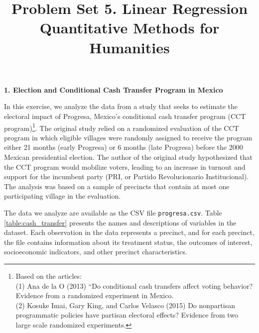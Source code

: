 \documentclass[12pt]{article}
\author{\empty}
\title{Problem Set 5. Linear Regression \\ Quantitative Methods for Humanities}
\date{\empty}
\begin{document}
\maketitle

\begin{center}
    \textbf{\large 1. Election and Conditional Cash Transfer Program in Mexico}
\end{center}

In this exercise, we analyze the data from a study that seeks to estimate the electoral impact of Progresa, Mexico’s conditional cash transfer program (CCT program)\footnote{Based on the articles: \\
(1) Ana de la O (2013) “Do conditional cash transfers affect voting behavior? Evidence from a randomized experiment in Mexico. \\
(2) Kosuke Imai, Gary King, and Carlos Velasco (2015) Do nonpartisan programmatic policies have partisan electoral effects? Evidence from two large scale randomized experiments.}. The original study relied on a randomized evaluation of the CCT program in which eligible villages were randomly assigned to receive the program either 21 months (early Progresa) or 6 months (late Progresa) before the 2000 Mexican presidential election. The author of the original study hypothesized that the CCT program would mobilize voters, leading to an increase in turnout and support for the incumbent party (PRI, or Partido Revolucionario Institucional). The analysis was based on a sample of precincts that contain at most one participating village in the evaluation.

The data we analyze are available as the CSV file \texttt{progresa.csv}. Table \ref{table:cash_transfer} presents the names and descriptions of variables in the dataset. Each observation in the data represents a precinct, and for each precinct, the file contains information about its treatment status, the outcomes of interest, socioeconomic indicators, and other precinct characteristics.
\end{document}
